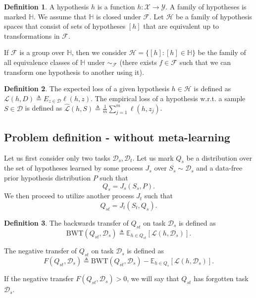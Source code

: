 \documentclass[letterpaper]{article}
\theoremstyle{definition}
\newtheorem{defn}{Definition}[section]
\begin{document}
\begin{defn}
	A hypothesis $h$ is a function $h:\mathcal{X}\rightarrow\mathcal{Y}$. A family of hypotheses is marked $\mathbb{H}$. We assume that $\mathbb{H}$ is closed under $\mathcal{F}$. Let $\mathcal{H}$ be a family of hypothesis spaces that consist of sets of hypotheses $[h]$ that are equivalent up to transformations in $\mathcal{F}$. 
	
	If $\mathcal{F}$ is a group over $\mathbb{H}$, then we consider $\mathcal{H}=\{[h]:[h]\in\mathbb{H}\}$ be the family of all equivalence classes of $\mathbb{H}$ under $\sim_\mathcal{F}$ (there exists $f\in\mathcal{F}$ such that we can transform one hypothesis to another using it).
\end{defn}

\begin{defn}
	The expected loss of a given hypothesis $h\in \mathcal{H}$ is defined as $\mathcal{L}(h, D) \triangleq E_{z\in \mathcal{D}} \ell(h, z)$. The empirical loss of a hypothesis w.\!r.\!t.\! a sample $S\in \mathcal{D}$ is defined as $\hat{\mathcal{L}}(h, S) \triangleq \frac{1}{m}\sum_{j=1}^{m}\ell(h, z_j)$.
\end{defn}

\subsection{Problem definition - without meta-learning} \label{sec:forgetting-formulation}

Let us first consider only two tasks $\mathcal{D}_s, \mathcal{D}_t$. Let us mark $Q_s$ be a distribution over the set of hypotheses learned by some process $J_s$ over $S_s\sim \mathcal{D}_s$ and a data-free prior hypothesis distribution $P$ such that $$Q_s=J_s(S_s, P).$$ We then proceed to utilize another process $J_t$ such that $$Q_{st}=J_t(S_t, Q_s).$$ 

\begin{defn}
	The backwards transfer of $Q_{st}$ on task $\mathcal{D}_s$ is defined as $$\mathrm{BWT}(Q_{st}, \mathcal{D}_s) \triangleq \mathbb{E}_{h\in Q_{st}}\left [\mathcal{L}(h, \mathcal{D}_s)\right ].$$
	
	The negative transfer of $Q_{st}$ on task $\mathcal{D}_s$ is defined as $$F(Q_{st}, \mathcal{D}_s) \triangleq \mathrm{BWT}(Q_{st}, \mathcal{D}_s) - \mathbb{E}_{h\in Q_{s}}\left [\mathcal{L}(h, \mathcal{D}_s)\right ].$$
	
	If the negative transfer $F(Q_{st}, \mathcal{D}_s)>0$, we will say that $Q_{st}$ has forgotten task $\mathcal{D}_s$.
\end{defn}
\end{document}
